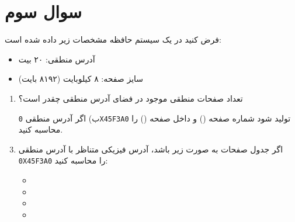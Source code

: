 \section{سوال سوم}



فرض کنید در یک سیستم حافظه مشخصات زیر داده شده است:

\begin{itemize}
	\item آدرس منطقی: ۲۰ بیت
	\item سایز صفحه: ۸ کیلوبایت (۸۱۹۲ بایت)
\end{itemize}



\begin{enumerate}
	\item تعداد صفحات منطقی موجود در فضای آدرس منطقی چقدر است؟
	
	
	
	
	\item[ب)] اگر آدرس منطقی \texttt{0X45F3A0} تولید شود شماره صفحه () و  داخل صفحه () را محاسبه کنید.
	
	
	
	
	\item اگر جدول صفحات به صورت زیر باشد، آدرس فیزیکی متناظر با آدرس منطقی \texttt{0X45F3A0} را محاسبه کنید:



\begin{latin}
	\begin{itemize}
		\item {}
		\item {}
		\item {}
		\item {}
	\end{itemize}
\end{latin}

\end{enumerate}
